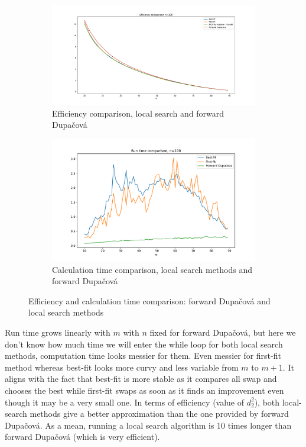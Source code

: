 \documentclass{amsart}
\begin{document}
\begin{figure}[ht]
    \centering
    \begin{subfigure}[b]{0.45\textwidth}
        \centering
        \includegraphics[width=\textwidth]{plots/milp local search efficiency.pdf}
        \caption{Efficiency comparison, local search and forward Dupačová}
        \label{value loc s}
    \end{subfigure}
    \hfill
    \begin{subfigure}[b]{0.45\textwidth}
        \centering
        \includegraphics[width=\textwidth]{plots/run time local search.pdf}
        \caption{Calculation time comparison, local search methods and forward Dupačová}
        \label{time loc s}
    \end{subfigure}
    \caption{Efficiency and calculation time comparison: forward Dupačová and local search methods}
    \label{comparison loc}
\end{figure}

Run time grows linearly with $m$ with $n$ fixed for forward Dupačová, but here we don't know how much time we will enter the while loop for both local search methods, computation time looks messier for them. Even messier for first-fit method whereas best-fit looks more curvy and less variable from $m$ to $m+1$. It aligns with the fact that best-fit is more stable as it compares all swap and chooses the best while first-fit swaps as soon as it finds an improvement even though it may be a very small one. In terms of efficiency (value of $d_2^2$), both local-search methods give a better approximation than the one provided by forward Dupačová. As a mean, running a local search algorithm is 10 times longer than forward Dupačová (which is very efficient).
\end{document}

